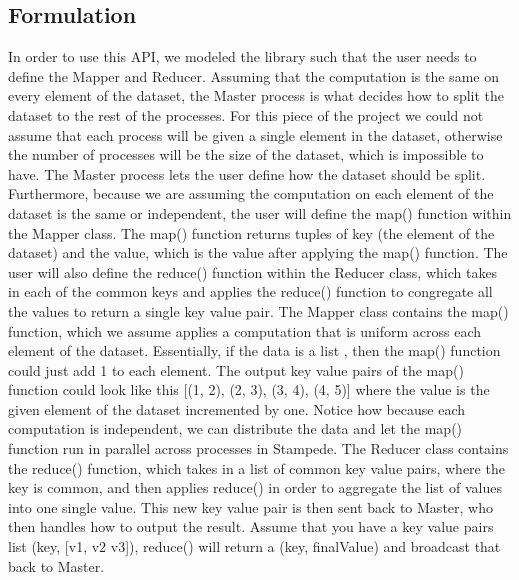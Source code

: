 \documentclass[11pt]{article}
\begin{document}
\subsection{Formulation}
In order to use this API, we modeled the library such that the user needs to define the Mapper and Reducer. Assuming that the computation is the same on every element of the dataset, the Master process is what decides how to split the dataset to the rest of the processes. For this piece of the project we could not assume that each process will be given a single element in the dataset, otherwise the number of processes will be the size of the dataset, which is impossible to have. 
\newline 
\indent The Master process lets the user define how the dataset should be split. Furthermore, because we are assuming the computation on each element of the dataset is the same or independent, the user will define the map() function within the Mapper class. The map() function returns tuples of key (the element of the dataset) and the value, which is the value after applying the map() function. The user will also define the reduce() function within the Reducer class, which takes in each of the common keys and applies the reduce() function to congregate all the values to return a single key value pair.
\newline
\indent The Mapper class contains the map() function, which we assume applies a computation that is uniform across each element of the dataset. Essentially, if the data is a list \newline [1, 2, 3, 4], then the map() function could just add 1 to each element. The output key value pairs of the map() function could look like this [(1, 2), (2, 3), (3, 4), (4, 5)] where the value is the given element of the dataset incremented by one. Notice how because each computation is independent, we can distribute the data and let the map() function run in parallel across processes in Stampede.
\newline
\indent
The Reducer class contains the reduce() function, which takes in a list of common key value pairs, where the key is common, and then applies reduce() in order to aggregate the list of values into one single value. This new key value pair is then sent back to Master, who then handles how to output the result. Assume that you have a key value pairs list (key, [v1, v2 v3]), reduce() will return a (key, finalValue) and broadcast that back to Master.
\end{document}
